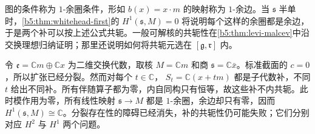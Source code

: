 图的条件称为 \(1\)-余圈条件，形如 \(b(x)=x\cdot m\) 的映射称为 \(1\)-余边。当 \(\mathfrak s\) 半单时，\cref{b5:thm:whitehead-first}的 \(H^1(\mathfrak s,M)=0\) 将说明每个这样的余圈都是余边，于是两个补可以按上述公式共轭。一般可解核的共轭性在\cref{b5:thm:levi-malcev}中沿交换理想归纳证明；那里还说明如何将共轭元选在 \([\mathfrak g,\mathfrak r]\) 内。

\begin{example}\label{b5:exm:abelian-nonconjugate-complements}
	令 \(\mathfrak e=\mathbb Cm\oplus\mathbb Cx\) 为二维交换代数，取核 \(M=\mathbb Cm\) 和商 \(\mathfrak s=\mathbb C\bar x\)。标准截面的 \(c=0\)，所以扩张已经分裂。然而对每个 \(t\in\mathbb C\)， \(S_t=\mathbb C(x+tm)\) 都是子代数补，不同 \(t\) 给出不同补。所有伴随算子都为零，内自同构只有恒等，故这些补不内共轭。此时模作用为零，所有线性映射 \(\mathfrak s\rightarrow M\) 都是 \(1\)-余圈，余边却只有零，因而 \(H^1(\mathfrak s,M)\cong\mathbb C\)。分裂存在性的障碍已经消失，补的共轭性仍可能失败；它们分别对应 \(H^2\) 与 \(H^1\) 两个问题。
\end{example}
